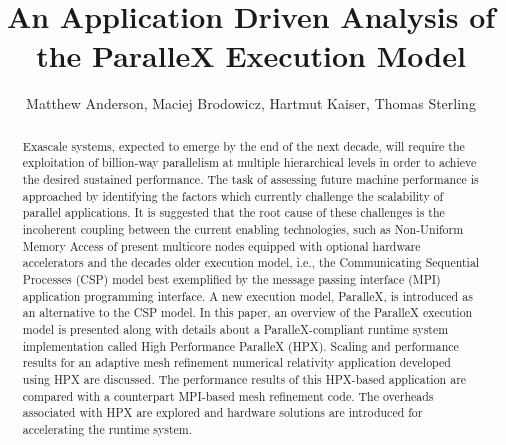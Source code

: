 \documentclass{revtex4}
\begin{document}
\title[An Application Driven Analysis of the ParalleX Execution Model]
{An Application Driven Analysis of the ParalleX Execution Model}


\author{Matthew Anderson,
        Maciej Brodowicz,
        Hartmut Kaiser,
        Thomas Sterling}



\begin{abstract}
Exascale systems, expected to emerge by the end of the next decade, 
  will require the exploitation of
  billion-way parallelism at multiple hierarchical levels in order to
  achieve the desired sustained performance.
  The task of assessing future machine performance is approached 
  by identifying the factors which
  currently challenge the scalability of parallel applications.
  It is suggested that the root cause of these challenges is the
  incoherent coupling between the current enabling technologies,
  such as Non-Uniform Memory Access of present multicore 
  nodes equipped with optional hardware accelerators and
  the decades older execution model, i.e., the Communicating Sequential
  Processes (CSP) model best exemplified by the message passing interface (MPI) 
application programming interface. 
  A new execution model, ParalleX, is introduced as an alternative to the CSP model.
  In this paper, an overview 
  of the ParalleX execution model is presented along with details about
  a ParalleX-compliant runtime system implementation called High Performance ParalleX (HPX).  
  Scaling and performance results for an adaptive mesh refinement numerical 
  relativity application developed using HPX are discussed.   The performance results 
  of this HPX-based application are compared with a counterpart MPI-based mesh refinement
  code.  The overheads associated with HPX are explored and
  hardware solutions are introduced for accelerating the runtime system.
\end{abstract}

\maketitle
\end{document}
